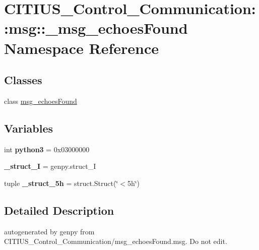 \hypertarget{namespace_c_i_t_i_u_s___control___communication_1_1msg_1_1__msg__echoes_found}{\section{\-C\-I\-T\-I\-U\-S\-\_\-\-Control\-\_\-\-Communication\-:\-:msg\-:\-:\-\_\-msg\-\_\-echoes\-Found \-Namespace \-Reference}
\label{namespace_c_i_t_i_u_s___control___communication_1_1msg_1_1__msg__echoes_found}
}
\subsection*{\-Classes}
\begin{DoxyCompactItemize}
\item 
class \hyperlink{class_c_i_t_i_u_s___control___communication_1_1msg_1_1__msg__echoes_found_1_1msg__echoes_found}{msg\-\_\-echoes\-Found}
\end{DoxyCompactItemize}
\subsection*{\-Variables}
\begin{DoxyCompactItemize}
\item 
\hypertarget{namespace_c_i_t_i_u_s___control___communication_1_1msg_1_1__msg__echoes_found_aad31e7d1baec3539c61812db6953741f}{int {\bfseries python3} = 0x03000000}\label{namespace_c_i_t_i_u_s___control___communication_1_1msg_1_1__msg__echoes_found_aad31e7d1baec3539c61812db6953741f}

\item 
\hypertarget{namespace_c_i_t_i_u_s___control___communication_1_1msg_1_1__msg__echoes_found_a049570bc1d7177363017ebb91c27642e}{{\bfseries \-\_\-struct\-\_\-\-I} = genpy.\-struct\-\_\-\-I}\label{namespace_c_i_t_i_u_s___control___communication_1_1msg_1_1__msg__echoes_found_a049570bc1d7177363017ebb91c27642e}

\item 
\hypertarget{namespace_c_i_t_i_u_s___control___communication_1_1msg_1_1__msg__echoes_found_ac7d90bdd9693068f075e8a25d2a367fe}{tuple {\bfseries \-\_\-struct\-\_\-5h} = struct.\-Struct(\char`\"{}$<$5h\char`\"{})}\label{namespace_c_i_t_i_u_s___control___communication_1_1msg_1_1__msg__echoes_found_ac7d90bdd9693068f075e8a25d2a367fe}

\end{DoxyCompactItemize}


\subsection{\-Detailed \-Description}
\begin{DoxyVerb}autogenerated by genpy from CITIUS_Control_Communication/msg_echoesFound.msg. Do not edit.\end{DoxyVerb}
 
